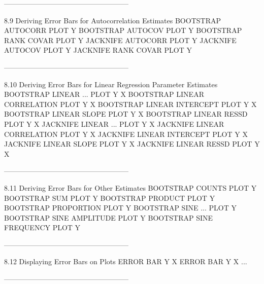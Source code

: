 -----------------------------------------------------
 
8.9
Deriving Error Bars for Autocorrelation Estimates
      BOOTSTRAP AUTOCORR PLOT Y
      BOOTSTRAP AUTOCOV PLOT Y
      BOOTSTRAP RANK COVAR PLOT Y
      JACKNIFE  AUTOCORR PLOT Y
      JACKNIFE  AUTOCOV PLOT Y
      JACKNIFE  RANK COVAR PLOT Y
 
-----------------------------------------------------
 
8.10
Deriving Error Bars for Linear Regression Parameter Estimates
      BOOTSTRAP LINEAR ... PLOT Y X
         BOOTSTRAP LINEAR CORRELATION PLOT Y X
         BOOTSTRAP LINEAR INTERCEPT PLOT Y X
         BOOTSTRAP LINEAR SLOPE PLOT Y X
         BOOTSTRAP LINEAR RESSD PLOT Y X
      JACKNIFE  LINEAR ... PLOT Y X
         JACKNIFE  LINEAR CORRELATION PLOT Y X
         JACKNIFE  LINEAR INTERCEPT PLOT Y X
         JACKNIFE  LINEAR SLOPE PLOT Y X
         JACKNIFE  LINEAR RESSD PLOT Y X
 
-----------------------------------------------------
 
8.11
Deriving Error Bars for Other Estimates
      BOOTSTRAP COUNTS PLOT Y
      BOOTSTRAP SUM PLOT Y
      BOOTSTRAP PRODUCT PLOT Y
      BOOTSTRAP PROPORTION PLOT Y
      BOOTSTRAP SINE ... PLOT Y
         BOOTSTRAP SINE AMPLITUDE PLOT Y
         BOOTSTRAP SINE FREQUENCY PLOT Y
 
-----------------------------------------------------
 
8.12
Displaying Error Bars on Plots
      ERROR BAR Y X
      ERROR BAR Y X ...
 
-----------------------------------------------------
 
 
 
 
 
 
 
 
 
 
 
 
 
 
 
 
 
 
 
 
 
 
 
 
 
 
 
 
 
 
 
 
 
 
 
 
 
 
 
 
 

